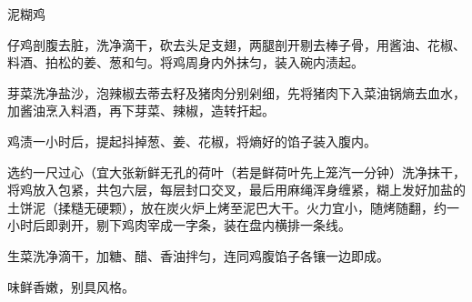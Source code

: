 \begin{recipe}[叫化鸡]{泥糊鸡}

\ingredients



\cooking

\step 仔鸡剖腹去脏，洗净滴干，砍去头足支翅，两腿剖开剔去棒子骨，用酱油、花椒、料酒、拍松的姜、葱和勻。将鸡周身内外抹匀，装入碗内渍起。

\step 芽菜洗净盐沙，泡辣椒去蒂去籽及猪肉分别剁细，先将猪肉下入菜油锅熵去血水，加酱油烹入料酒，再下芽菜、辣椒，造转扞起。

\step 鸡渍一小时后，提起抖掉葱、姜、花椒，将熵好的馅子装入腹内。

\step 选约一尺过心（宜大张新鲜无孔的荷叶（若是鲜荷叶先上笼汽一分钟）洗净抹干，将鸡放入包紧，共包六层，每层封口交叉，最后用麻绳浑身缠紧，糊上发好加盐的土饼泥（揉糙无硬颗），放在炭火炉上烤至泥巴大干。火力宜小，随烤随翻，约一小时后即剥开，剔下鸡肉宰成一字条，装在盘内横排一条线。

\step 生菜洗净滴干，加糖、醋、香油拌匀，连同鸡腹馅子各镶一边即成。

\notes

味鲜香嫩，别具风格。

\end{recipe}

